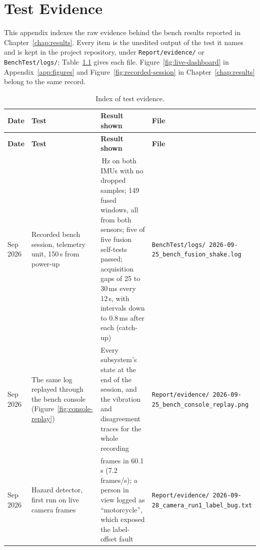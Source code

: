 \chapter{Test Evidence}
\label{app:evidence}

This appendix indexes the raw evidence behind the bench results reported in Chapter~\ref{chap:results}. Every item is the unedited output of the test it names and is kept in the project repository, under \texttt{Report/evidence/} or \texttt{BenchTest/logs/}; Table~\ref{tab:evidence-index} gives each file. Figure~\ref{fig:live-dashboard} in Appendix~\ref{app:figures} and Figure~\ref{fig:recorded-session} in Chapter~\ref{chap:results} belong to the same record.

\begin{longtable}{|>{\raggedright\arraybackslash}p{1.7cm}|>{\raggedright\arraybackslash}p{3.6cm}|>{\raggedright\arraybackslash}p{5.2cm}|>{\raggedright\arraybackslash}p{3.6cm}|}
\caption[Index of test evidence]{Index of test evidence.}
\label{tab:evidence-index}\\
\hline
\textbf{Date} & \textbf{Test} & \textbf{Result shown} & \textbf{File} \\ \hline
\endfirsthead
\hline
\textbf{Date} & \textbf{Test} & \textbf{Result shown} & \textbf{File} \\ \hline
\endhead
25 Sep 2026 & Recorded bench session, telemetry unit, 150\,s from power-up & 200\,Hz on both IMUs with no dropped samples; 149 fused windows, all from both sensors; five of five fusion self-tests passed; acquisition gaps of 25 to 30\,ms every 12\,s, with intervals down to 0.8\,ms after each (catch-up) & \texttt{BenchTest/\allowbreak{}logs/\allowbreak{} 2026-09-25\_\allowbreak{}bench\_\allowbreak{}fusion\_\allowbreak{}shake.log} \\ \hline
25 Sep 2026 & The same log replayed through the bench console (Figure~\ref{fig:console-replay}) & Every subsystem's state at the end of the session, and the vibration and disagreement traces for the whole recording & \texttt{Report/\allowbreak{}evidence/\allowbreak{} 2026-09-25\_\allowbreak{}bench\_\allowbreak{}console\_\allowbreak{}replay.png} \\ \hline
28 Sep 2026 & Hazard detector, first run on live camera frames & 430 frames in 60.1\,s (7.2\,frames/s); a person in view logged as ``motorcycle'', which exposed the label-offset fault & \texttt{Report/\allowbreak{}evidence/\allowbreak{} 2026-09-28\_\allowbreak{}camera\_\allowbreak{}run1\_\allowbreak{}label\_\allowbreak{}bug.txt} \\ \hline

\end{longtable}
